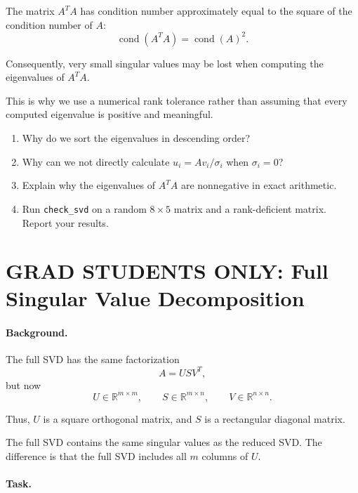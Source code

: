\documentclass{ximera}
\begin{document}
The matrix $A^TA$ has condition number approximately equal to
the square of the condition number of $A$:
\[
\operatorname{cond}(A^TA)=\operatorname{cond}(A)^2.
\]

Consequently, very small singular values may be lost when
computing the eigenvalues of $A^TA$.

This is why we use a numerical rank tolerance rather than
assuming that every computed eigenvalue is positive and meaningful.

\begin{exercise}

\begin{enumerate}

    \item Why do we sort the eigenvalues in descending order?

    \item Why can we not directly calculate
    $u_i=Av_i/\sigma_i$ when $\sigma_i=0$?

    \item Explain why the eigenvalues of $A^TA$ are nonnegative
    in exact arithmetic.

    \item Run \texttt{check\_svd} on a random $8\times5$ matrix
    and a rank-deficient matrix. Report your results.

\end{enumerate}

\end{exercise}

\section{GRAD STUDENTS ONLY: Full Singular Value Decomposition}

\paragraph{Background.}

The full SVD has the same factorization
\[
A=USV^T,
\]
but now
\[
U\in\mathbb{R}^{m\times m},\qquad
S\in\mathbb{R}^{m\times n},\qquad
V\in\mathbb{R}^{n\times n}.
\]

Thus, $U$ is a square orthogonal matrix, and $S$ is a rectangular
diagonal matrix.

The full SVD contains the same singular values as the reduced SVD.
The difference is that the full SVD includes all $m$ columns
of $U$.

\paragraph{Task.}
\end{document}
